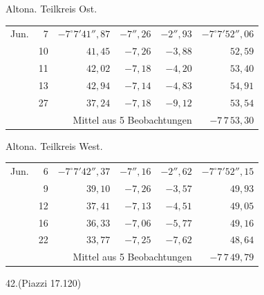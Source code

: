 \noindent\begin{minipage}[t]{.495\textwidth}\centering Altona. Teilkreis Ost.\par\smallskip
{\scriptsize\setlength{\tabcolsep}{1pt}\renewcommand{\arraystretch}{1.2}\begin{tabular}{lr|r|r|r|r|}
Jun.&7&$-7^\circ7'41''{,}87$&$-7''{,}26$&$-2''{,}93$&$-7^\circ7'52''{,}06$\\
&10&$41{,}45$&$-7{,}26$&$-3{,}88$&$52{,}59$\\
&11&$42{,}02$&$-7{,}18$&$-4{,}20$&$53{,}40$\\
&13&$42{,}94$&$-7{,}14$&$-4{,}83$&$54{,}91$\\
&27&$37{,}24$&$-7{,}18$&$-9{,}12$&$53{,}54$\\
\cline{6-6}\multicolumn{5}{r}{Mittel aus 5 Beobachtungen}&$-7\,7\,53{,}30$
\end{tabular}}\end{minipage}\hfill\begin{minipage}[t]{.495\textwidth}\centering Altona. Teilkreis West.\par\smallskip
{\scriptsize\setlength{\tabcolsep}{1pt}\renewcommand{\arraystretch}{1.2}\begin{tabular}{lr|r|r|r|r}
Jun.&6&$-7^\circ7'42''{,}37$&$-7''{,}16$&$-2''{,}62$&$-7^\circ7'52''{,}15$\\
&9&$39{,}10$&$-7{,}26$&$-3{,}57$&$49{,}93$\\
&12&$37{,}41$&$-7{,}13$&$-4{,}51$&$49{,}05$\\
&16&$36{,}33$&$-7{,}06$&$-5{,}77$&$49{,}16$\\
&22&$33{,}77$&$-7{,}25$&$-7{,}62$&$48{,}64$\\
\cline{6-6}\multicolumn{5}{r}{Mittel aus 5 Beobachtungen}&$-7\,7\,49{,}79$
\end{tabular}}\end{minipage}
\par\vspace{4mm}
\begin{center}42.\quad (Piazzi 17.120)\end{center}

